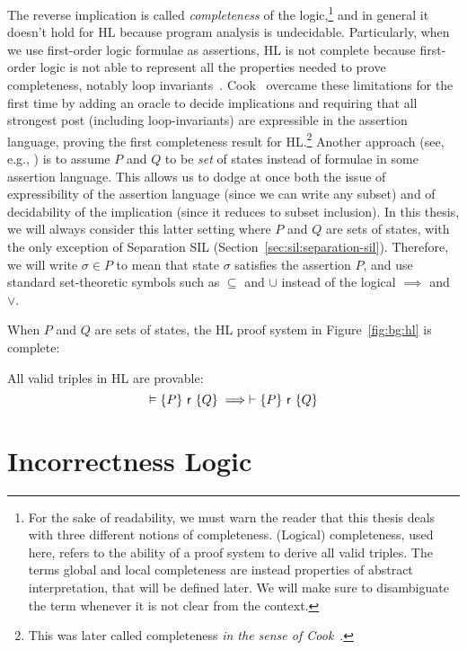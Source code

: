 The reverse implication is called \emph{completeness} of the logic,\footnote{For the sake of readability, we must warn the reader that this thesis deals with three different notions of completeness. (Logical) completeness, used here, refers to the ability of a proof system to derive all valid triples. The terms global and local completeness are instead properties of abstract interpretation, that will be defined later. We will make sure to disambiguate the term whenever it is not clear from the context.} and in general it doesn't hold for HL because program analysis is undecidable. Particularly, when we use first-order logic formulae as assertions, HL is not complete because first-order logic is not able to represent all the properties needed to prove completeness, notably loop invariants~\cite[§2.7]{Apt81}.
Cook~\cite{Cook78} overcame these limitations for the first time by adding an oracle to decide implications and requiring that all strongest post (including loop-invariants) are expressible in the assertion language, proving the first completeness result for HL.\footnote{This was later called completeness \emph{in the sense of Cook}~\cite[§2.8]{Apt81}.}
Another approach (see, e.g., \cite{CCLB12,OHearn20}) is to assume $P$ and $Q$ to be \emph{set} of states instead of formulae in some assertion language. This allows us to dodge at once both the issue of expressibility of the assertion language (since we can write any subset) and of decidability of the implication (since it reduces to subset inclusion).
In this thesis, we will always consider this latter setting where $P$ and $Q$ are sets of states, with the only exception of Separation SIL (Section~\ref{sec:sil:separation-sil}). Therefore, we will write $\sigma \in P$ to mean that state $\sigma$ satisfies the assertion $P$, and use standard set-theoretic symbols such as $\subseteq$ and $\cup$ instead of the logical $\implies$ and $\lor$.

When $P$ and $Q$ are sets of states, the HL proof system in Figure~\ref{fig:bg:hl} is complete:

\begin{theorem}
	All valid triples in HL are provable:
	\[
	\vDash \{P\}~\mathsf{r}~\{Q\} \implies \vdash \{P\}~\mathsf{r}~\{Q\}
	\]
\end{theorem}

\section{Incorrectness Logic}\label{sec:bg:il}

